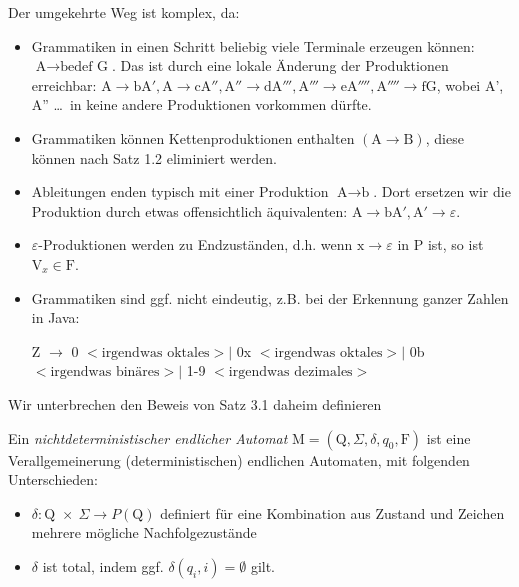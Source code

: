 \documentclass[11pt, a4paper]{article}
\begin{document}
\begin{flushleft}
    Der umgekehrte Weg ist komplex, da:

    \begin{itemize}[-]
        \item Grammatiken in einen Schritt beliebig viele Terminale erzeugen können:
              \(\text{A} \rightarrow \text{bedef G}\). Das ist durch eine lokale Änderung der Produktionen erreichbar:
              \(\text{A} \rightarrow \text{bA}', \text{A} \rightarrow \text{cA}'', \text{A}'' \rightarrow \text{dA}''', \text{A}''' \rightarrow \text{eA}'''', \text{A}'''' \rightarrow \text{fG}\), wobei A', A'' \ldots\ in keine andere Produktionen vorkommen dürfte.

        \item Grammatiken können Kettenproduktionen enthalten \((\text{A} \rightarrow \text{B})\), diese können nach Satz 1.2 eliminiert werden.
        \item Ableitungen enden typisch mit einer Produktion  \(\text{A} \rightarrow \text{b}\). Dort ersetzen wir die Produktion durch etwas offensichtlich äquivalenten: \(\text{A} \rightarrow \text{bA}', \text{A}' \rightarrow \varepsilon\).
        \item \(\varepsilon\)-Produktionen werden zu Endzuständen, d.h. wenn \(\text{x} \rightarrow \varepsilon\) in P ist, so ist \(\text{V}_x \in \text{F}\).
        \item Grammatiken sind ggf. nicht eindeutig, z.B. bei der Erkennung ganzer Zahlen in Java:


              Z \(\rightarrow\) 0 \(<\text{irgendwas oktales}> |\)
              0x \(<\text{irgendwas oktales}> |\)
              0b \(<\text{irgendwas binäres}> |\)
              1-9 \(<\text{irgendwas dezimales}>\)
    \end{itemize}

    Wir unterbrechen den Beweis von Satz 3.1 daheim definieren


    \begin{tcolorbox}[title = Definition 3.4]
        Ein \emph{nichtdeterministischer endlicher Automat} \(\text{M} = (\text{Q}, \Sigma, \delta, q_0, \text{F})\) ist eine Verallgemeinerung (deterministischen) endlichen Automaten, mit folgenden Unterschieden:
        \begin{itemize}[-]
            \item \(\delta : \text{Q } \times\ \Sigma \rightarrow P(\text{Q})\) definiert für eine Kombination aus Zustand und Zeichen mehrere mögliche Nachfolgezustände
            \item \(\delta\) ist total, indem ggf. \(\delta(q_i, i) = \emptyset\) gilt.
        \end{itemize}


\end{tcolorbox}
\end{flushleft}
\end{document}
